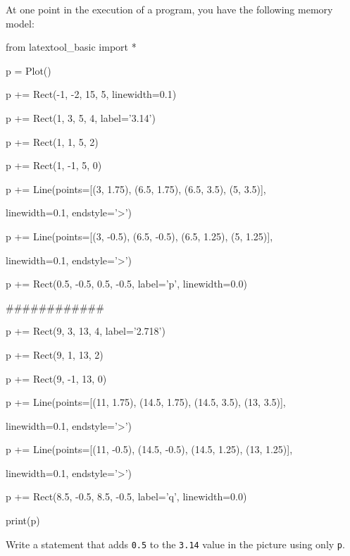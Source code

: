 At one point in the execution of a program, you have the following memory model:

\begin{python}

from latextool_basic import *

p = Plot()



p += Rect(-1, -2, 15, 5, linewidth=0.1)



p += Rect(1, 3, 5, 4, label='3.14')

p += Rect(1, 1, 5, 2)

p += Rect(1, -1, 5, 0)



p += Line(points=[(3, 1.75), (6.5, 1.75), (6.5, 3.5), (5, 3.5)],

          linewidth=0.1, endstyle='>')

p += Line(points=[(3, -0.5), (6.5, -0.5), (6.5, 1.25), (5, 1.25)],

          linewidth=0.1, endstyle='>')



p += Rect(0.5, -0.5, 0.5, -0.5, label='p', linewidth=0.0)

############



p += Rect(9, 3, 13, 4, label='2.718')

p += Rect(9, 1, 13, 2)

p += Rect(9, -1, 13, 0)



p += Line(points=[(11, 1.75), (14.5, 1.75), (14.5, 3.5), (13, 3.5)],

          linewidth=0.1, endstyle='>')

p += Line(points=[(11, -0.5), (14.5, -0.5), (14.5, 1.25), (13, 1.25)],

          linewidth=0.1, endstyle='>')



p += Rect(8.5, -0.5, 8.5, -0.5, label='q', linewidth=0.0)



print(p)

\end{python}



Write a statement that adds \texttt{0.5} to the \texttt{3.14} value in the picture using only \texttt{p}.

